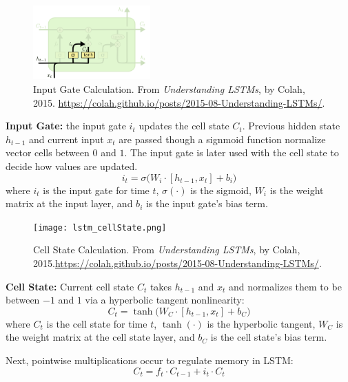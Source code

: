 \begin{program}
\begin{figure}
\vspace{-20pt}
\begin{center}
    \includegraphics[width=0.4\textwidth]{imgs/lstm_inputGate.png}
\end{center}
\vspace{-20pt}
\caption{\footnotesize Input Gate Calculation. From \emph{Understanding LSTMs}, by Colah, 2015. \url{https://colah.github.io/posts/2015-08-Understanding-LSTMs/}. } 
\vspace{-5pt}
\label{fig:inputGate}
\end{figure}
\textbf{Input Gate: } the input gate $i_t$ updates the cell state $C_t$. Previous hidden state $h_{t-1}$ and current input $x_t$ are passed though a signmoid function normalize vector cells between $0$ and $1$. The input gate is later used with the cell state to decide how values are updated. 
$$
i_t = \sigma \Big( W_i \cdot [h_{t-1}, x_t] + b_i \Big)
$$
where $i_t$ is the input gate for time $t$, $\sigma(\cdot)$ is the sigmoid, $W_i$ is the weight matrix at the input layer, and $b_i$ is the input gate's bias term. \par \kern 5pt
\end{program}





\begin{program}
\begin{figure}
\vspace{-20pt}
\begin{center}
    \texttt{[image: lstm\_cellState.png]}    
\end{center}
\vspace{-20pt}
\caption{\footnotesize Cell State Calculation. From \emph{Understanding LSTMs}, by Colah, 2015.\url{https://colah.github.io/posts/2015-08-Understanding-LSTMs/}. }
\vspace{-5pt}
\label{fig:cellState}
\end{figure}

\textbf{Cell State: } Current cell state $C_t$ takes $h_{t-1}$ and $x_t$ and normalizes them to be between $-1$ and $1$ via a hyperbolic tangent nonlinearity:
$$
C_t = \tanh \Big( W_C \cdot [h_{t-1}, x_t] + b_C \Big)
$$
where $C_t$ is the cell state for time $t$, $\tanh(\cdot)$ is the hyperbolic tangent, $W_C$ is the weight matrix at the cell state layer, and $b_C$ is the cell state's bias term. 

Next, pointwise multiplications occur to regulate memory in LSTM: 
$$
C_t = f_t \cdot C_{t-1} + i_t \cdot C_t
$$
\end{program}


